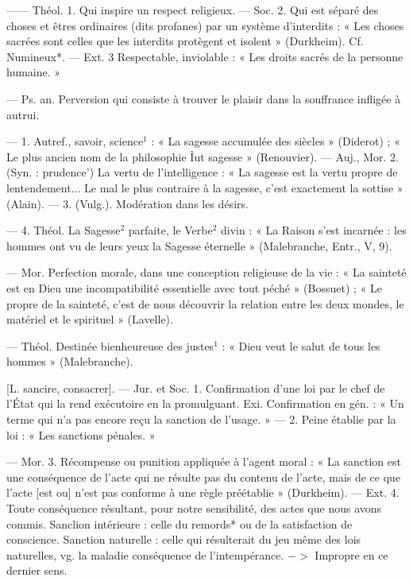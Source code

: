 	\begin{itemize}[leftmargin=1cm, label=, itemsep=1pt]
 —— Théol. 1. Qui inspire un
respect religieux. — Soc. 2. Qui est
séparé des choses et êtres ordinaires
(dits profanes) par un système d’interdits : « Les choses sacrées sont
celles que les interdits protègent et
isolent » (Durkheim). Cf. Numineux*.
— Ext. 3 Respectable, inviolable :
« Les droits sacrés de la personne
humaine. »

 — Ps. an. Perversion qui
consiste à trouver le plaisir dans la
souffrance infligée à autrui.

 — 1. Autref., savoir, science$^1$ :
« La sagesse accumulée des siècles »
(Diderot) ; « Le plus ancien nom de
la philosophie Îut sagesse » (Renouvier). — Auj., Mor. 2. (Syn. : prudence') La vertu de l'intelligence :
« La sagesse est la vertu propre de
lentendement... Le mal le plus contraire à la sagesse, c’est exactement
la sottise » (Alain). — 3. (Vulg.).
Modération dans les désirs.

— 4. Théol. La Sagesse$^2$ parfaite,
le Verbe$^2$ divin : « La Raison s'est
incarnée : les hommes ont vu de
leurs yeux la Sagesse éternelle »
(Malebranche, Entr., V, 9).

 — Mor. Perfection morale,
dans une conception religieuse de la
vie : « La sainteté est en Dieu une
incompatibilité essentielle avec tout
péché » (Bossuet) ; « Le propre de la
sainteté, c’est de nous découvrir la
relation entre les deux mondes, le
matériel et le spirituel » (Lavelle).

 — Théol. Destinée bienheureuse des justes$^1$ : « Dieu veut le
salut de tous les hommes » (Malebranche).

 [L. sancire, consacrer]. —
Jur. et Soc. 1. Confirmation d’une
loi par le chef de l'État qui la rend
exécutoire en la promulguant. Exi.
Confirmation en gén. : « Un terme
qui n’a pas encore reçu la sanction
de l'usage. » — 2. Peine établie par
la loi : « Les sanctions pénales. »

— Mor. 3. Récompense ou punition appliquée à l’agent moral : « La
sanction est une conséquence de
l’acte qui ne résulte pas du contenu
de l'acte, mais de ce que l’acte [est
ou] n’est pas conforme à une règle
préétablie » (Durkheim). — Ext. 4.
Toute conséquence résultant, pour
notre sensibilité, des actes que nous
avons commis. Sanclion intérieure :
celle du remords* ou de la satisfaction de conscience. Sanction naturelle : celle qui résulterait du jeu
même des lois naturelles, vg. la
maladie conséquence de l’intempérance. $->$ Impropre en ce dernier
sens.


\end{itemize}
